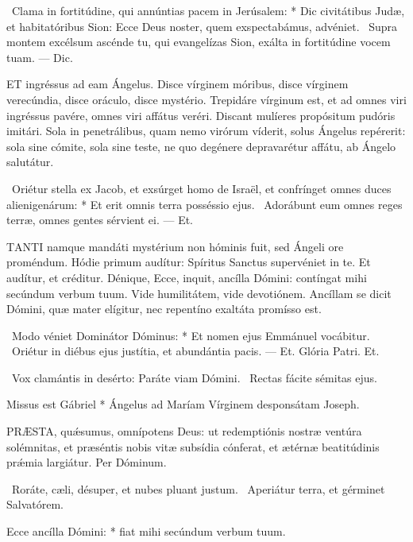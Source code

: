 \R\ Clama in fortitúdine, qui annúntias pacem in Jerúsalem: * Dic civitátibus Judæ, et habitatóribus Sion: Ecce Deus noster, quem exspectabámus, advéniet. \V\ Supra montem excélsum ascénde tu, qui evangelízas Sion, exálta in fortitúdine vocem tuam. --- Dic.


\lettrine[lines=2]{E}{T} ingréssus ad eam Ángelus. Disce vírginem móribus, disce vírginem verecúndia, disce oráculo, disce mystério. Trepidáre vírginum est, et ad omnes viri ingréssus pavére, omnes viri affátus veréri. Discant mulíeres propósitum pudóris imitári. Sola in penetrálibus, quam nemo virórum víderit, solus Ángelus repérerit: sola sine cómite, sola sine teste, ne quo degénere depravarétur affátu, ab Ángelo salutátur.

\R\ Oriétur stella ex Jacob, et exsúrget homo de Israël, et confrínget omnes duces alienigenárum: * Et erit omnis terra posséssio ejus. \V\ Adorábunt eum omnes reges terræ, omnes gentes sérvient ei. --- Et.


\lettrine[lines=2]{T}{ANTI} namque mandáti mystérium non hóminis fuit, sed Ángeli ore proméndum. Hódie primum audítur: Spíritus Sanctus supervéniet in te. Et audítur, et créditur. Dénique, Ecce, inquit, ancílla Dómini: contíngat mihi secúndum verbum tuum. Vide humilitátem, vide devotiónem. Ancíllam se dicit Dómini, quæ mater elígitur, nec repentíno exaltáta promísso est.

\R\ Modo véniet Dominátor Dóminus: * Et nomen ejus Emmánuel vocábitur. \V\ Oriétur in diébus ejus justítia, et abundántia pacis. --- Et. Glória Patri. Et.

\V\ Vox clamántis in desérto: Paráte viam Dómini. \R\ Rectas fácite sémitas ejus.

 Missus est Gábriel * Ángelus ad Maríam Vírginem desponsátam Joseph.


\lettrine[lines=2]{P}{RÆSTA}, quǽsumus, omnípotens Deus: ut redemptiónis nostræ ventúra solémnitas, et præséntis nobis vitæ subsídia cónferat, et ætérnæ beatitúdinis prǽmia largiátur. Per Dóminum.


\V\ Roráte, cæli, désuper, et nubes pluant justum. \R\ Aperiátur terra, et gérminet Salvatórem.

 Ecce ancílla Dómini: * fiat mihi secúndum verbum tuum.

